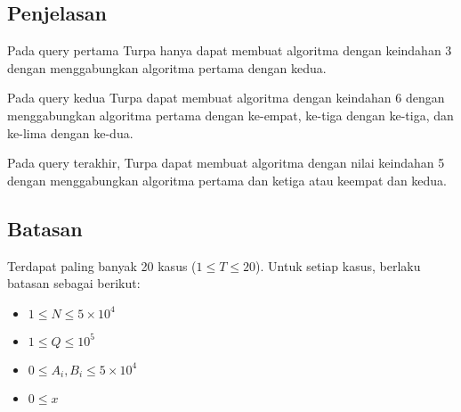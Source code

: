 \documentclass{article}
\begin{document}
\subsection*{Penjelasan}

\par Pada query pertama Turpa hanya dapat membuat algoritma dengan keindahan 3 dengan menggabungkan algoritma pertama dengan kedua.
\par Pada query kedua Turpa dapat membuat algoritma dengan keindahan 6 dengan menggabungkan algoritma pertama dengan ke-empat, ke-tiga dengan ke-tiga, dan ke-lima dengan ke-dua.
\par Pada query terakhir, Turpa dapat membuat algoritma dengan nilai keindahan 5 dengan menggabungkan algoritma pertama dan ketiga atau keempat dan kedua.

\subsection*{Batasan}

\par Terdapat paling banyak 20 kasus ($1 \leq T \leq 20$). Untuk setiap kasus, berlaku batasan sebagai berikut:
\begin{itemize}
	\item $1 \leq N \leq 5\times 10^4$
	\item $1 \leq Q \leq 10^5$
	\item $0 \leq A_i,B_i \leq 5\times 10^4$
	\item $0 \leq x$
\end{itemize}
\end{document}
